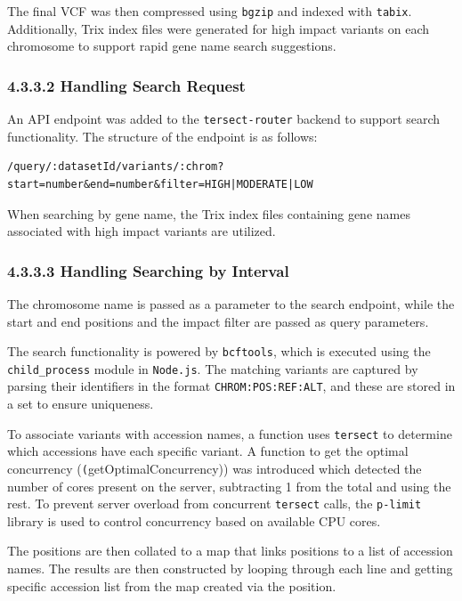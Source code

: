 \documentclass[12pt]{article}
\begin{document}
The final VCF was then compressed using \texttt{bgzip} and indexed with \texttt{tabix}. Additionally, Trix index files \citep{ucsc_trix} were generated for high impact variants on each chromosome to support rapid gene name search suggestions.

\subsubsection*{4.3.3.2 Handling Search Request}

An API endpoint was added to the \texttt{tersect-router} backend to support search functionality. The structure of the endpoint is as follows:

\begin{verbatim}
/query/:datasetId/variants/:chrom?start=number&end=number&filter=HIGH|MODERATE|LOW
\end{verbatim}

When searching by gene name, the Trix index files containing gene names associated with high impact variants are utilized.

\subsubsection*{4.3.3.3 Handling Searching by Interval}

The chromosome name is passed as a parameter to the search endpoint, while the start and end positions and the impact filter are passed as query parameters.

The search functionality is powered by \texttt{bcftools}, which is executed using the \texttt{child\_process} module in \texttt{Node.js}. The matching variants are captured by parsing their identifiers in the format \texttt{CHROM:POS:REF:ALT}, and these are stored in a set to ensure uniqueness. 

To associate variants with accession names, a function uses \texttt{tersect} to determine which accessions have each specific variant. A function to get the optimal concurrency (\texttt(getOptimalConcurrency)) was introduced which detected the number of cores present on the server, subtracting 1 from the total and using the rest. To prevent server overload from concurrent \texttt{tersect} calls, the \texttt{p-limit} library is used to control concurrency based on available CPU cores.

The positions are then collated to a map that links positions to a list of accession names. The results are then constructed by looping through each line and getting specific accession list from the map created via the position.
\end{document}
